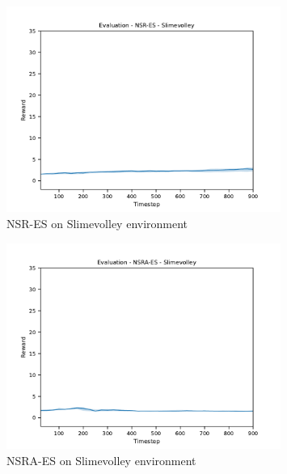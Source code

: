 \begin{figure}[H]
    \includegraphics[width=0.8\textwidth]{img/eval-slime-nsres.pdf}
    \caption{NSR-ES on Slimevolley environment}
    \label{fig:slime-nsr}

\end{figure}
\begin{figure}[H]
    \includegraphics[width=0.8\textwidth]{img/eval-slime-nsraes.pdf}
    \caption{NSRA-ES on Slimevolley environment}
    \label{fig:slime-nsra}

\end{figure}
\newpage